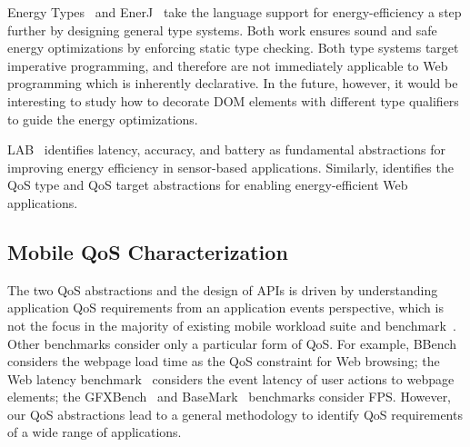 Energy Types~\cite{energytypes} and EnerJ~\cite{enerJ} take the language support for energy-efficiency a step further by designing general type systems. Both work ensures sound and safe energy optimizations by enforcing static type checking. Both type systems target imperative programming, and therefore are not immediately applicable to Web programming which is inherently declarative. In the future, however, it would be interesting to study how to decorate DOM elements with different type qualifiers to guide the energy optimizations.

LAB~\cite{lab} identifies latency, accuracy, and battery as fundamental abstractions for improving energy efficiency in sensor-based applications. Similarly, \greenweb identifies the QoS type and QoS target abstractions for enabling energy-efficient Web applications.

\subsection{Mobile QoS Characterization}
\label{sec:lang:related:qos}

The two QoS abstractions and the design of \greenweb APIs is driven by understanding application QoS requirements from an application events perspective, which is not the focus in the majority of existing mobile workload suite and benchmark~\cite{jsbench,BrowsingBench,BrowserMark,MobileBench,Moby,Vellamo,AnTuTu,sunspider,Octane,Kraken,GeekBench}. Other benchmarks consider only a particular form of QoS. For example, BBench~\cite{BBench} considers the webpage load time as the QoS constraint for Web browsing; the Web latency benchmark~\cite{WebLatencyBenchmark} considers the event latency of user actions to webpage elements; the GFXBench~\cite{GFXBench} and BaseMark~\cite{BaseMark} benchmarks consider FPS. However, our QoS abstractions lead to a general methodology to identify QoS requirements of a wide range of applications.
